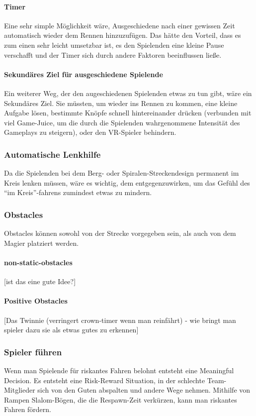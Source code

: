 \paragraph{Timer}
Eine sehr simple Möglichkeit wäre, Ausgeschiedene nach einer gewissen Zeit automatisch wieder dem Rennen hinzuzufügen. Das hätte den Vorteil, dass es zum einen sehr leicht umsetzbar ist, es den Spielenden eine kleine Pause verschafft und der Timer sich durch andere Faktoren beeinflussen ließe.

\paragraph{Sekundäres Ziel für ausgeschiedene Spielende}
Ein weiterer Weg, der den augeschiedenen Spielenden etwas zu tun gibt, wäre ein Sekundäres Ziel. Sie müssten, um wieder ins Rennen zu kommen, eine kleine Aufgabe lösen, bestimmte Knöpfe schnell hintereinander drücken (verbunden mit viel Game-Juice, um die durch die Spielenden wahrgenommene Intensität des Gameplays zu steigern), oder den VR-Spieler behindern.

\subsubsection{Automatische Lenkhilfe}
Da die Spielenden bei dem Berg- oder Spiralen-Streckendesign permanent im Kreis lenken müssen, wäre es wichtig, dem entgegenzuwirken, um das Gefühl des "`im Kreis"'-fahrens zumindest etwas zu mindern.

\subsubsection{Obstacles}
Obstacles können sowohl von der Strecke vorgegeben sein, als auch von dem Magier platziert werden.

\paragraph{non-static-obstacles}
[ist das eine gute Idee?]

\paragraph{Positive Obstacles}
[Das Twinnie (verringert crown-timer wenn man reinfährt) - wie bringt man spieler dazu sie als etwas gutes zu erkennen]

\subsubsection{Spieler führen}
Wenn man Spielende für riskantes Fahren belohnt entsteht eine Meaningful Decision. Es entsteht eine Risk-Reward Situation, in der schlechte Team-Mitglieder sich von den Guten abspalten und andere Wege nehmen. Mithilfe von Rampen Slalom-Bögen, die die Respawn-Zeit verkürzen, kann man riskantes Fahren fördern.

